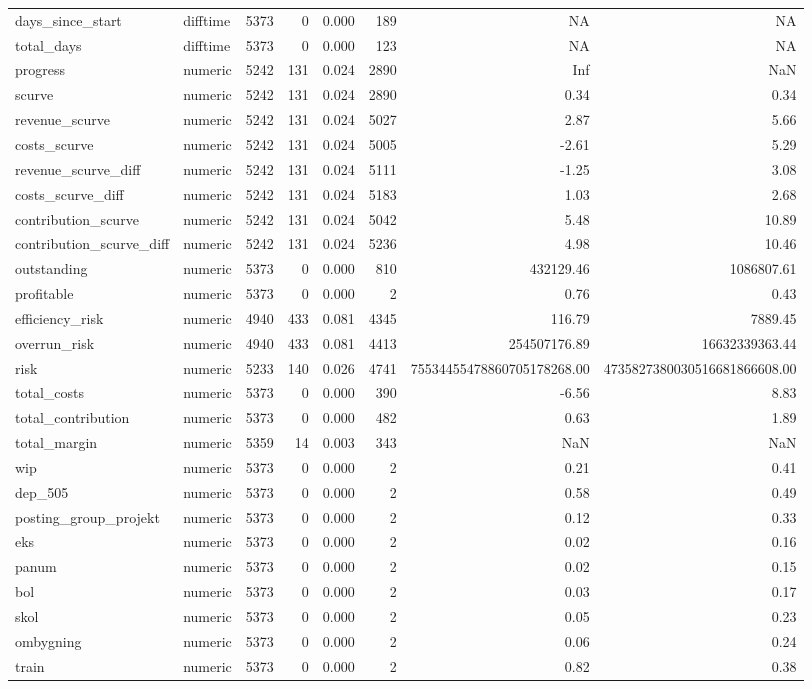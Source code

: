 \begin{landscape}
\begin{longtable}[t]{llrrrrrr}
days\_since\_start & difftime & 5373 & 0 & 0.000 & 189 & NA & NA\\
total\_days & difftime & 5373 & 0 & 0.000 & 123 & NA & NA\\
progress & numeric & 5242 & 131 & 0.024 & 2890 & Inf & NaN\\
scurve & numeric & 5242 & 131 & 0.024 & 2890 & 0.34 & 0.34\\
revenue\_scurve & numeric & 5242 & 131 & 0.024 & 5027 & 2.87 & 5.66\\
costs\_scurve & numeric & 5242 & 131 & 0.024 & 5005 & -2.61 & 5.29\\
revenue\_scurve\_diff & numeric & 5242 & 131 & 0.024 & 5111 & -1.25 & 3.08\\
costs\_scurve\_diff & numeric & 5242 & 131 & 0.024 & 5183 & 1.03 & 2.68\\
contribution\_scurve & numeric & 5242 & 131 & 0.024 & 5042 & 5.48 & 10.89\\
contribution\_scurve\_diff & numeric & 5242 & 131 & 0.024 & 5236 & 4.98 & 10.46\\
outstanding & numeric & 5373 & 0 & 0.000 & 810 & 432129.46 & 1086807.61\\
profitable & numeric & 5373 & 0 & 0.000 & 2 & 0.76 & 0.43\\
efficiency\_risk & numeric & 4940 & 433 & 0.081 & 4345 & 116.79 & 7889.45\\
overrun\_risk & numeric & 4940 & 433 & 0.081 & 4413 & 254507176.89 & 16632339363.44\\
risk & numeric & 5233 & 140 & 0.026 & 4741 & 75534455478860705178268.00 & 4735827380030516681866608.00\\
total\_costs & numeric & 5373 & 0 & 0.000 & 390 & -6.56 & 8.83\\
total\_contribution & numeric & 5373 & 0 & 0.000 & 482 & 0.63 & 1.89\\
total\_margin & numeric & 5359 & 14 & 0.003 & 343 & NaN & NaN\\
wip & numeric & 5373 & 0 & 0.000 & 2 & 0.21 & 0.41\\
dep\_505 & numeric & 5373 & 0 & 0.000 & 2 & 0.58 & 0.49\\
posting\_group\_projekt & numeric & 5373 & 0 & 0.000 & 2 & 0.12 & 0.33\\
eks & numeric & 5373 & 0 & 0.000 & 2 & 0.02 & 0.16\\
panum & numeric & 5373 & 0 & 0.000 & 2 & 0.02 & 0.15\\
bol & numeric & 5373 & 0 & 0.000 & 2 & 0.03 & 0.17\\
skol & numeric & 5373 & 0 & 0.000 & 2 & 0.05 & 0.23\\
ombygning & numeric & 5373 & 0 & 0.000 & 2 & 0.06 & 0.24\\
train & numeric & 5373 & 0 & 0.000 & 2 & 0.82 & 0.38\\*
\end{longtable}
\end{landscape}
\endgroup{}
